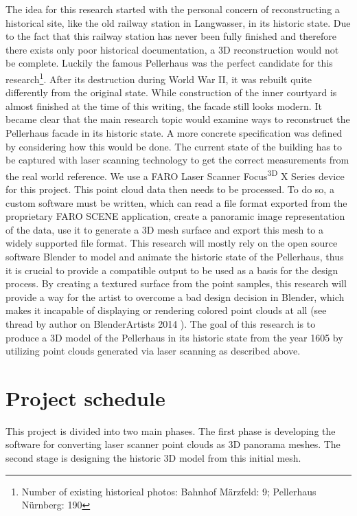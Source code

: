 The idea for this research started with the personal concern of reconstructing a historical site, like the old railway station in Langwasser, in its historic state. Due to the fact that this railway station has never been fully finished and therefore there exists only poor historical documentation, a 3D reconstruction would not be complete. Luckily the famous Pellerhaus was the perfect candidate for this research\footnote{Number of existing historical photos: Bahnhof Märzfeld: 9; Pellerhaus Nürnberg: 190}. After its destruction during World War II, it was rebuilt quite differently from the original state. While construction of the inner courtyard is almost finished at the time of this writing, the facade still looks modern. It became clear that the main research topic would examine ways to reconstruct the Pellerhaus facade in its historic state.
A more concrete specification was defined by considering how this would be done. The current state of the building has to be captured with laser scanning technology to get the correct measurements from the real world reference. We use a FARO Laser Scanner Focus\textsuperscript{3D} X Series device for this project.
This point cloud data then needs to be processed. To do so, a custom software must be written, which can read a file format exported from the proprietary FARO SCENE application, create a panoramic image representation of the data, use it to generate a 3D mesh surface and export this mesh to a widely supported file format. This research will mostly rely on the open source software Blender to model and animate the historic state of the Pellerhaus, thus it is crucial to provide a compatible output to be used as a basis for the design process. By creating a textured surface from the point samples, this research will provide a way for the artist to overcome a bad design decision in Blender, which makes it incapable of displaying or rendering colored point clouds at all (see thread by author on BlenderArtists 2014 \parencite{webBlenderArtistsPointCloudSupport} ). The goal of this research is to produce a 3D model of the Pellerhaus in its historic state from the year 1605 by utilizing point clouds generated via laser scanning as described above.

\section{Project schedule}

This project is divided into two main phases. The first phase is developing the software for converting laser scanner point clouds as 3D panorama meshes. The second stage is designing the historic 3D model from this initial mesh.\\

